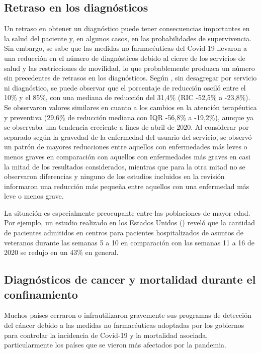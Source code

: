 \documentclass[12pt,twoside]{article} %
\begin{document}
\subsection{Retraso en los diagnósticos}\label{sec:diagnoses}
Un retraso en obtener un diagnóstico puede tener consecuencias importantes en la salud del paciente y, en algunos casos, en las probabilidades de supervivencia. Sin embargo, se sabe que las medidas no farmacéuticas del Covid-19 llevaron a una reducción en el número de diagnósticos debido al cierre de los servicios de salud y las restricciones de movilidad, lo que probablemente produzca un número sin precedentes de retrasos en los diagnósticos. Según \cite{moynihan_impact_2021}, sin desagregar por servicio ni diagnóstico, se puede observar que el porcentaje de reducción osciló entre el 10\% y el 85\%, con una mediana de reducción del 31,4\% (RIC -52,5\% a -23,8\%). Se observaron valores similares en cuanto a los cambios en la atención terapéutica y preventiva (29,6\% de reducción mediana con IQR -56,8\% a -19,2\%), aunque ya se observaba una tendencia creciente a fines de abril de 2020. Al considerar por separado según la gravedad de la enfermedad del usuario del servicio, se observó un patrón de mayores reducciones entre aquellos con enfermedades más leves o menos graves en comparación con aquellos con enfermedades más graves en casi la mitad de los resultados considerados, mientras que para la otra mitad no se observaron diferencias y ninguno de los estudios incluidos en la revisión informaron una reducción más pequeña entre aquellos con una enfermedad más leve o menos grave.

La situación es especialmente preocupante entre las poblaciones de mayor edad. Por ejemplo, un estudio realizado en los Estados Unidos (\cite{baum_admissions_2020}) reveló que la cantidad de pacientes admitidos en centros para pacientes hospitalizados de asuntos de veteranos durante las semanas 5 a 10 en comparación con las semanas 11 a 16 de 2020 se redujo en un 43\% en general.

\subsection{Diagnósticos de cancer y mortalidad durante el confinamiento}\label{sec:cancer}
Muchos países cerraron o infrautilizaron gravemente sus programas de detección del cáncer debido a las medidas no farmacéuticas adoptadas por los gobiernos para controlar la incidencia de Covid-19 y la mortalidad asociada, particularmente los países que se vieron más afectados por la pandemia. 
\end{document}
